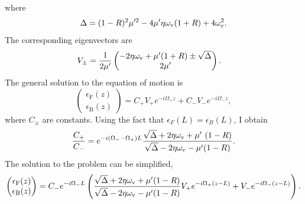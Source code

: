 where
\begin{equation}
   \Delta = (1-R)^2 \mu'^2  - 4\mu' \eta\omega_\mathrm v (1+R) + 4\omega_\mathrm v^2.
\end{equation}
The corresponding eigenvectors are
\begin{align}
   V_\pm &= \frac{1}{2\mu'}\begin{pmatrix}
   { -2\eta\omega_\mathrm v+  \mu' (1+R) \pm \sqrt{\Delta} } \\
   2\mu'
   \end{pmatrix}.
\end{align}
The general solution to the equation of motion is
\begin{equation*}
   \begin{pmatrix}
   \epsilon_{\mathrm F}(z) \\
   \epsilon_{\mathrm B}(z)
   \end{pmatrix} = C_+ V_+ e^{-i \Omega_+ z} +  C_- V_- e^{-i \Omega_- z},
\end{equation*}
where $C_\pm$ are constants. Using the fact that $\epsilon_F(L)=\epsilon_B(L)$, I obtain
\begin{equation}
   \frac{C_+}{C_-} = e^{-i(\Omega_- -\Omega_+)L} \frac{ \sqrt{\Delta} +  2\eta\omega_\mathrm v + \mu' \ (1-R) }{\sqrt{\Delta} -  2\eta\omega_\mathrm v - \mu' (1-R)}.
\end{equation}
The solution to the problem can be simplified,
\begin{equation}
   \begin{pmatrix}
   \epsilon_{\mathrm F}(z) \\
   \epsilon_{\mathrm B}(z)
   \end{pmatrix} = C_- e^{-i\Omega_- L} \left( \frac{ \sqrt{\Delta} +  2\eta\omega_\mathrm v + \mu'  (1-R) }{\sqrt{\Delta} -  2\eta\omega_\mathrm v - \mu' (1-R)} V_+ e^{-i \Omega_+ (z-L)} +  V_- e^{-i \Omega_- (z-L)} \right).
\end{equation}

